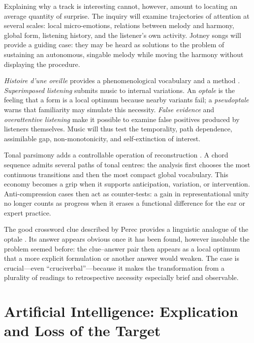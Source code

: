 \documentclass[11pt,a4paper]{article}
\begin{document}
Explaining why a track is interesting cannot, however, amount to locating an
average quantity of surprise. The inquiry will examine trajectories of
attention at several scales: local micro-emotions, relations between melody and
harmony, global form, listening history, and the listener's own activity.
Jotney songs will provide a guiding case: they may be heard as solutions to the
problem of sustaining an autonomous, singable melody while moving the harmony
without displaying the procedure.

\emph{Histoire d'une oreille} provides a phenomenological vocabulary and a
method \parencite{pachet2018oreille}. \emph{Superimposed listening} submits
music to internal variations. An \emph{optale} is the feeling that a form is a
local optimum because nearby variants fail; a \emph{pseudoptale} warns that
familiarity may simulate this necessity. \emph{False evidence} and
\emph{overattentive listening} make it possible to examine false positives
produced by listeners themselves. Music will thus test the temporality, path
dependence, assimilable gap, non-monotonicity, and self-extinction of interest.

Tonal parsimony adds a controllable operation of reconstruction
\parencite{pachet2026tonalparsimony}. A chord sequence admits several paths of
tonal centres: the analysis first chooses the most continuous transitions and
then the most compact global vocabulary. This economy becomes a grip when it
supports anticipation, variation, or intervention. Anti-compression cases then
act as counter-tests: a gain in representational unity no longer counts as
progress when it erases a functional difference for the ear or expert practice.

The good crossword clue described by Perec provides a linguistic analogue of
the optale \parencite{perec1999motscroises}. Its answer appears obvious once it
has been found, however insoluble the problem seemed before: the clue--answer pair then
appears as a local optimum that a more explicit formulation or another answer
would weaken. The case is crucial---even ``cruciverbal''---because it makes the
transformation from a plurality of readings to retrospective necessity
especially brief and observable.

\section{Artificial Intelligence: Explication and Loss of the Target}
\end{document}

